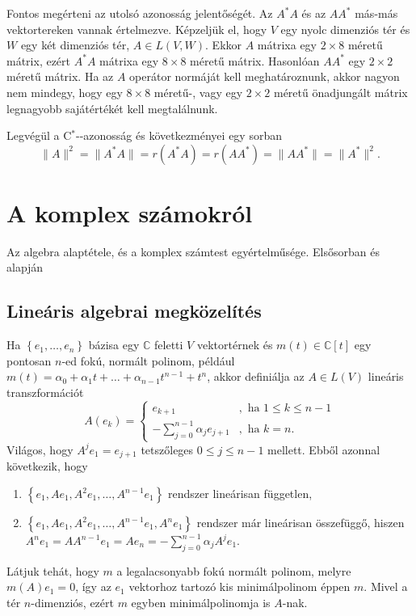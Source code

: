 \documentclass[9pt, a4paper, showtrims]{memoir}
\theoremstyle{plain}
\theoremstyle{remark}
\theoremstyle{definition}
\newcommand{\Star}[1]{#1\ensuremath{^*}\kern-\scriptspace}
\newcommand{\CStar}{\Star{\ensuremath{\mathrm{C}}}}
\begin{document}
Fontos megérteni az utolsó azonosság jelentőségét.
Az $A^\ast A$ és az $AA^\ast$ más-más vektortereken vannak értelmezve.
Képzeljük el, hogy $V$ egy nyolc dimenziós tér és $W$ egy két dimenziós tér, $A\in L\left( V,W \right)$.
Ekkor $A$ mátrixa egy $2\times 8$ méretű mátrix, ezért $A^\ast A$ mátrixa egy $8\times 8$ méretű mátrix.
Hasonlóan $AA^\ast$ egy $2\times 2$ méretű mátrix.
Ha az $A$ operátor normáját kell meghatároznunk,
akkor nagyon nem mindegy,
hogy egy $8\times 8$ méretű-, vagy egy $2\times 2$ méretű önadjungált mátrix legnagyobb sajátértékét kell megtalálnunk.

Legvégül a \CStar-azonosság és következményei egy sorban
\[
	\|A\|^2=\|A^\ast A\|=r\left( A^\ast A \right)
	=
	r\left( AA^\ast \right)=\|A A^\ast\|=\|A^\ast\|^2.
\]

\appendix
\renewcommand{\chaptername}{függelék}
\renewcommand{\appendixpagename}{Függelékek}\renewcommand{\appendixtocname}{\appendixpagename}
\appendixpage

\chapter{A komplex számokról}
Az algebra alaptétele, és a komplex számtest egyértelműsége. Elsősorban \parencite{MR1415833} és \parencite{10.2307/3647746} alapján
\section{Lineáris algebrai megközelítés}
Ha $\left\{ e_1,\ldots,e_n \right\}$ bázisa egy $\mathbb{C}$ feletti $V$ vektortérnek
és $m\left( t \right)\in\mathbb{C}\left[ t \right]$ egy pontosan $n$-ed fokú,
normált polinom,
például
$m\left( t \right)=\alpha_0+\alpha_1 t+\dots+\alpha_{n-1}t^{n-1}+t^{n}$,
akkor definiálja az $A\in L\left( V \right)$ lineáris transzformációt
\[
	A\left( e_k \right)=
	\begin{cases}
		e_{k+1}                           & , \text{ ha } 1\leq k \leq n-1 \\
		-\sum_{j=0}^{n-1}\alpha_j e_{j+1} & , \text{ ha } k=n.
	\end{cases}
\]
Világos, hogy $A^je_1=e_{j+1}$ tetszőleges $0\leq j\leq n-1$ mellett.
Ebből azonnal következik, hogy
\begin{enumerate}
	\item
	      $\left\{ e_1, Ae_1,A^2e_1,\ldots,A^{n-1}e_1\right\}$ rendszer lineárisan független,
	\item
	      $\left\{ e_1, Ae_1,A^2e_1,\ldots,A^{n-1}e_1,A^ne_1\right\}$ rendszer már lineárisan összefüggő,
	      hiszen
	      $A^ne_1=AA^{n-1}e_1=Ae_n=-\sum_{j=0}^{n-1}\alpha_j A^je_1$.
\end{enumerate}
Látjuk tehát, hogy $m$ a legalacsonyabb fokú normált polinom, melyre
$m\left( A \right)e_1=0$,
így az $e_1$ vektorhoz tartozó kis minimálpolinom éppen $m$.
Mivel a tér $n$-dimenziós, ezért $m$ egyben minimálpolinomja is $A$-nak.
\end{document}
